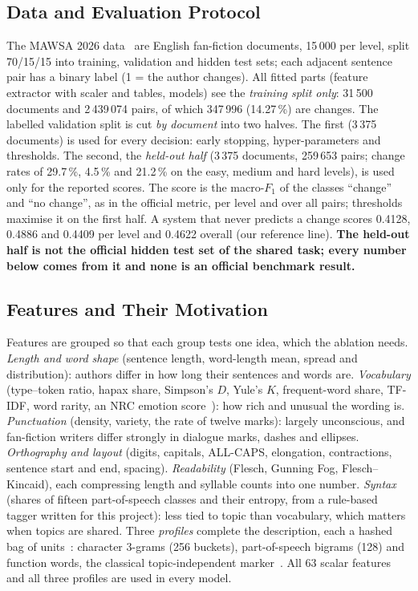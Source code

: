 \documentclass[runningheads]{llncs}
\begin{document}
\subsection{Data and Evaluation Protocol}

The MAWSA 2026 data~\cite{zangerle_2026_19068843,zangerle:2026} are English fan-fiction documents, 15\,000 per level, split 70/15/15 into training, validation and hidden test sets; each adjacent sentence pair has a binary label (1 = the author changes). All fitted parts (feature extractor with scaler and tables, models) see the \emph{training split only}: 31\,500 documents and 2\,439\,074 pairs, of which 347\,996 (14.27\,\%) are changes. The labelled validation split is cut \emph{by document} into two halves. The first (3\,375 documents) is used for every decision: early stopping, hyper-parameters and thresholds. The second, the \emph{held-out half} (3\,375 documents, 259\,653 pairs; change rates of 29.7\,\%, 4.5\,\% and 21.2\,\% on the easy, medium and hard levels), is used only for the reported scores. The score is the macro-$F_1$ of the classes ``change'' and ``no change'', as in the official metric, per level and over all pairs; thresholds maximise it on the first half. A system that never predicts a change scores 0.4128, 0.4886 and 0.4409 per level and 0.4622 overall (our reference line). \textbf{The held-out half is not the official hidden test set of the shared task; every number below comes from it and none is an official benchmark result.}

\subsection{Features and Their Motivation}

Features are grouped so that each group tests one idea, which the ablation needs. \emph{Length and word shape} (sentence length, word-length mean, spread and distribution): authors differ in how long their sentences and words are. \emph{Vocabulary} (type--token ratio, hapax share, Simpson's $D$, Yule's $K$, frequent-word share, TF-IDF, word rarity, an NRC emotion score~\cite{mohammad2013crowdsourcing}): how rich and unusual the wording is. \emph{Punctuation} (density, variety, the rate of twelve marks): largely unconscious, and fan-fiction writers differ strongly in dialogue marks, dashes and ellipses. \emph{Orthography and layout} (digits, capitals, ALL-CAPS, elongation, contractions, sentence start and end, spacing). \emph{Readability} (Flesch, Gunning Fog, Flesch--Kincaid), each compressing length and syllable counts into one number. \emph{Syntax} (shares of fifteen part-of-speech classes and their entropy, from a rule-based tagger written for this project): less tied to topic than vocabulary, which matters when topics are shared. Three \emph{profiles} complete the description, each a hashed bag of units~\cite{weinberger2009hashing}: character 3-grams (256 buckets), part-of-speech bigrams (128) and function words, the classical topic-independent marker~\cite{mosteller1964inference}. All 63 scalar features and all three profiles are used in every model.
\end{document}
